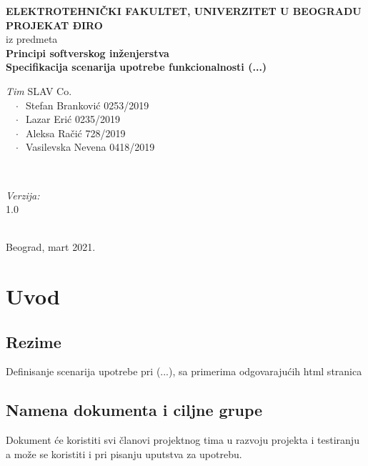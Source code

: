 \documentclass[12pt]{article}
\begin{document}
    \renewcommand{\labelenumii}{\arabic{enumi}.\arabic{enumii}}
	\begin{titlepage}  
		\center
		\textbf{ \LARGE ELEKTROTEHNIČKI FAKULTET, UNIVERZITET U BEOGRADU } \\[4cm]
		\textbf{ \Large PROJEKAT ĐIRO\texttrademark} \\[0.3cm]
		iz predmeta \\[0.3cm]
		\textbf{ \Large Principi softverskog inženjerstva} \\[0.7cm]
		{ \huge \bfseries Specifikacija scenarija upotrebe funkcionalnosti (...) } \\[6cm]
		

		\begin{minipage}{0.5\textwidth}
			\begin{flushleft}
				\large
				\emph{Tim} SLAV Co. \\
			     $\;\;\; \cdot \;\;$Stefan Branković  0253/2019\\
			     $\;\;\; \cdot \;\;$Lazar Erić 0235/2019\\
			     $\;\;\; \cdot \;\;$Aleksa Račić 728/2019\\
			     $\;\;\; \cdot \;\;$Vasilevska Nevena 0418/2019
			\end{flushleft}
		\end{minipage}
		~
		\begin{minipage}{0.4\textwidth}
			\begin{flushright}
				\large
				\emph{Verzija:} \\
				1.0
			\end{flushright}
		\end{minipage} \\[2cm]
		\enlargethispage{4\baselineskip}
		{ \large Beograd, mart 2021. }
		\vfill
	\end{titlepage}
\pagebreak
\tableofcontents
\pagebreak



\section{Uvod}
\subsection{Rezime}
Definisanje scenarija upotrebe pri (...), sa primerima odgovarajućih html stranica
\subsection{Namena dokumenta i ciljne grupe}
Dokument će koristiti svi članovi projektnog tima u razvoju projekta i testiranju a može se koristiti i pri pisanju uputstva za
upotrebu.
\end{document}
